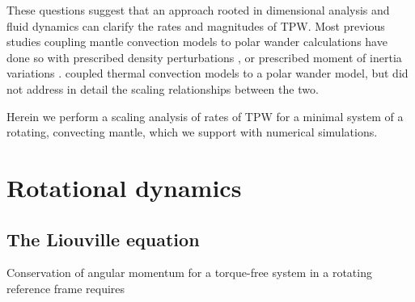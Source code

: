 \documentclass[preprint,12pt,authoryear]{elsarticle}
\begin{document}
These questions suggest that an approach rooted in dimensional analysis and fluid dynamics can clarify the rates and magnitudes of TPW.
Most previous studies coupling mantle convection models to polar wander calculations have done so with prescribed density perturbations \citep[e.g.][]{greff2004upwelling}, or prescribed moment of inertia variations \citep[e.g.][]{tsai2007theoretical, creveling2012mechanisms}. 
\citet{richards1999polar} coupled thermal convection models to a polar wander model, but did not address in detail the scaling relationships between the two.

Herein we perform a scaling analysis of rates of TPW for a minimal system of a rotating, convecting mantle,  which we support with numerical simulations.

\section{Rotational dynamics}
\label{sec:rotational_dynamics}

\subsection{The Liouville equation}
\label{sec:liouville}
Conservation of angular momentum for a torque-free system in a rotating reference frame requires
\end{document}
